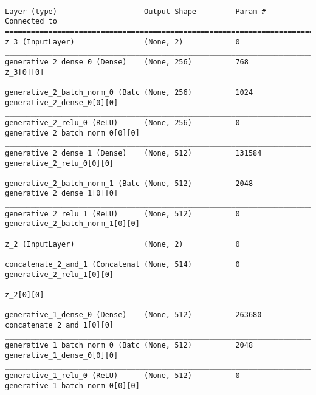 \begin{lstlisting}[caption={CelebA-\ac{VLAE}-\ac{GAN} Decoder},captionpos=b,basicstyle=\tiny, label={lst:mnist-vlae-gan-decoder}]
__________________________________________________________________________________________________
Layer (type)                    Output Shape         Param #     Connected to
==================================================================================================
z_3 (InputLayer)                (None, 2)            0
__________________________________________________________________________________________________
generative_2_dense_0 (Dense)    (None, 256)          768         z_3[0][0]
__________________________________________________________________________________________________
generative_2_batch_norm_0 (Batc (None, 256)          1024        generative_2_dense_0[0][0]
__________________________________________________________________________________________________
generative_2_relu_0 (ReLU)      (None, 256)          0           generative_2_batch_norm_0[0][0]
__________________________________________________________________________________________________
generative_2_dense_1 (Dense)    (None, 512)          131584      generative_2_relu_0[0][0]
__________________________________________________________________________________________________
generative_2_batch_norm_1 (Batc (None, 512)          2048        generative_2_dense_1[0][0]
__________________________________________________________________________________________________
generative_2_relu_1 (ReLU)      (None, 512)          0           generative_2_batch_norm_1[0][0]
__________________________________________________________________________________________________
z_2 (InputLayer)                (None, 2)            0
__________________________________________________________________________________________________
concatenate_2_and_1 (Concatenat (None, 514)          0           generative_2_relu_1[0][0]
                                                                 z_2[0][0]
__________________________________________________________________________________________________
generative_1_dense_0 (Dense)    (None, 512)          263680      concatenate_2_and_1[0][0]
__________________________________________________________________________________________________
generative_1_batch_norm_0 (Batc (None, 512)          2048        generative_1_dense_0[0][0]
__________________________________________________________________________________________________
generative_1_relu_0 (ReLU)      (None, 512)          0           generative_1_batch_norm_0[0][0]

\end{lstlisting}
